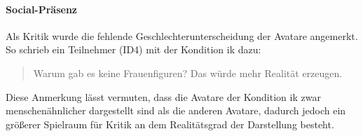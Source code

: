 \documentclass[a4paper,11pt]{article}%
\renewcommand{\\}{\vspace*{0.5\baselineskip} \newline}
\begin{document}
\paragraph{Social-Präsenz} Als Kritik wurde die fehlende Geschlechterunterscheidung der Avatare angemerkt. So schrieb ein Teilnehmer (ID4) mit der Kondition \ac{ik} dazu:
\begin{quote}
\glqq{}Warum gab es keine Frauenfiguren? Das würde mehr Realität erzeugen.\dq{}
\end{quote}
Diese Anmerkung lässt vermuten, dass die Avatare der Kondition \ac{ik} zwar menschenähnlicher dargestellt sind als die anderen Avatare, dadurch jedoch ein größerer Spielraum für Kritik an dem Realitätsgrad der Darstellung besteht.
%
%
%
\end{document}
